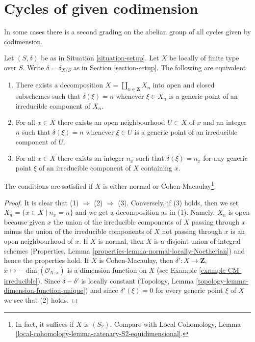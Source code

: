 \section{Cycles of given codimension}
\label{section-cycles-codimension}

\noindent
In some cases there is a second grading on the abelian group
of all cycles given by codimension.

\begin{lemma}
\label{lemma-locally-equidimensional}
Let $(S, \delta)$ be as in Situation \ref{situation-setup}.
Let $X$ be locally of finite type over $S$. Write
$\delta = \delta_{X/S}$ as in Section \ref{section-setup}.
The following are equivalent
\begin{enumerate}
\item There exists a decomposition $X = \coprod_{n \in \mathbf{Z}} X_n$
into open and closed subschemes such that $\delta(\xi) = n$ whenever
$\xi \in X_n$ is a generic point of an irreducible component of $X_n$.
\item For all $x \in X$ there exists an open neighbourhood $U \subset X$
of $x$ and an integer $n$ such that $\delta(\xi) = n$ whenever
$\xi \in U$ is a generic point of an irreducible component of $U$.
\item For all $x \in X$ there exists an integer $n_x$ such that
$\delta(\xi) = n_x$ for any generic point $\xi$ of an irreducible
component of $X$ containing $x$.
\end{enumerate}
The conditions are satisfied if $X$ is either
normal or Cohen-Macaulay\footnote{In fact, it suffices if
$X$ is $(S_2)$. Compare with Local Cohomology, Lemma
\ref{local-cohomology-lemma-catenary-S2-equidimensional}.}.
\end{lemma}

\begin{proof}
It is clear that (1) $\Rightarrow$ (2) $\Rightarrow$ (3).
Conversely, if (3) holds, then we set $X_n = \{x \in X \mid n_x = n\}$
and we get a decomposition as in (1). Namely, $X_n$ is open because
given $x$ the union of the irreducible components of $X$ passing through $x$
minus the union of the irreducible components of $X$ not passing through $x$
is an open neighbourhood of $x$. If $X$ is normal, then $X$ is a
disjoint union of integral schemes
(Properties, Lemma \ref{properties-lemma-normal-locally-Noetherian})
and hence the properties hold.
If $X$ is Cohen-Macaulay, then
$\delta' : X \to \mathbf{Z}$, $x \mapsto -\dim(\mathcal{O}_{X, x})$
is a dimension function on $X$ (see Example \ref{example-CM-irreducible}).
Since $\delta - \delta'$ is locally constant
(Topology, Lemma \ref{topology-lemma-dimension-function-unique})
and since $\delta'(\xi) = 0$ for every generic point $\xi$ of $X$
we see that (2) holds.
\end{proof}

